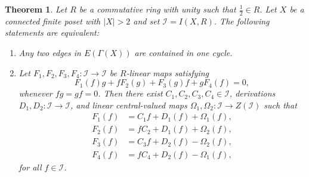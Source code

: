 \documentclass[10pt,a4paper]{amsart}
\newtheorem{theorem}{Theorem}
\newcommand{\I}{\mathcal I}
\begin{document}
\begin{theorem}\label{thm:main-characterization}
Let $R$ be a commutative ring with unity such that $\frac{1}{2}\in R$.
Let $X$ be a connected finite poset with $|X|>2$ and set $\I=I(X,R)$.
The following statements are equivalent:
\begin{enumerate}
\item[(i)] Any two edges in $E(\Gamma(X))$ are contained in one cycle.
\item[(ii)] Let $F_1,F_2,F_3,F_4:\I\to\I$ be $R$-linear maps satisfying
\begin{equation}\label{eq:four-map-local}
F_1(f)g+fF_2(g)+F_3(g)f+gF_4(f)=0,
\end{equation}
whenever $fg=gf=0$. Then there exist
$C_1,C_2,C_3,C_4\in\I$, derivations $D_1,D_2:\I\to\I$, and linear
central-valued maps $\Omega_1,\Omega_2:\I\to Z(\I)$ such that
\begin{equation}\label{eq:four-map-standard}
\begin{aligned}
F_1(f)&=C_1f+D_1(f)+\Omega_1(f),\\
F_2(f)&=fC_2+D_1(f)+\Omega_2(f),\\
F_3(f)&=C_3f+D_2(f)-\Omega_2(f),\\
F_4(f)&=fC_4+D_2(f)-\Omega_1(f),
\end{aligned}
\end{equation}
for all $f\in\I$.
\end{enumerate}
\end{theorem}
\end{document}
